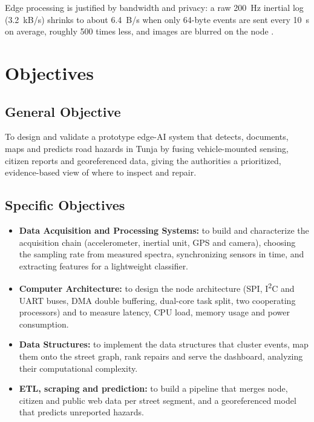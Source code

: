 \documentclass[journal,10pt]{IEEEtran}
\begin{document}
Edge processing is justified by bandwidth and privacy: a raw 200~Hz inertial log (3.2~kB/s) shrinks to about 6.4~B/s when only 64-byte events are sent every 10~s on average, roughly 500 times less, and images are blurred on the node \cite{ley1581}.


\section{Objectives}
\subsection{General Objective}
To design and validate a prototype edge-AI system that detects, documents, maps and predicts road hazards in Tunja by fusing vehicle-mounted sensing, citizen reports and georeferenced data, giving the authorities a prioritized, evidence-based view of where to inspect and repair.

\subsection{Specific Objectives}
\begin{itemize}
\item \textbf{Data Acquisition and Processing Systems:} to build and characterize the acquisition chain (accelerometer, inertial unit, GPS and camera), choosing the sampling rate from measured spectra, synchronizing sensors in time, and extracting features for a lightweight classifier.
\item \textbf{Computer Architecture:} to design the node architecture (SPI, I\textsuperscript{2}C and UART buses, DMA double buffering, dual-core task split, two cooperating processors) and to measure latency, CPU load, memory usage and power consumption.
\item \textbf{Data Structures:} to implement the data structures that cluster events, map them onto the street graph, rank repairs and serve the dashboard, analyzing their computational complexity.
\item \textbf{ETL, scraping and prediction:} to build a pipeline that merges node, citizen and public web data per street segment, and a georeferenced model that predicts unreported hazards.
\end{itemize}

\end{document}

